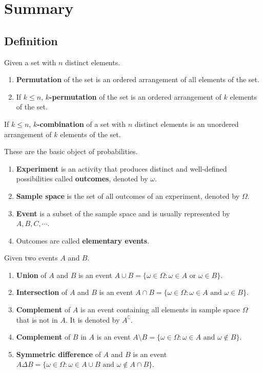 \documentclass{huhtakm-template-book}
\begin{document}
\chapter*{Summary}
\section*{Definition}
\begin{sdefn}
	Given a set with $n$ distinct elements.
	\begin{enumerate}
		\item \textbf{Permutation} of the set is an ordered arrangement of all elements of the set.
		\item If $k\leq n$, \textbf{$k$-permutation} of the set is an ordered arrangement of $k$ elements of the set.
	\end{enumerate}
\end{sdefn}
\begin{sdefn}
	If $k\leq n$, \textbf{$k$-combination} of a set with $n$ distinct elements is an unordered arrangement of $k$ elements of the set.
\end{sdefn}
\begin{sdefn}
	These are the basic object of probabilities.
	\begin{enumerate}
		\item \textbf{Experiment} is an activity that produces distinct and well-defined possibilities called \textbf{outcomes}, denoted by $\omega$.
		\item \textbf{Sample space} is the set of all outcomes of an experiment, denoted by $\Omega$.
		\item \textbf{Event} is a subset of the sample space and is usually represented by $A,B,C,\cdots$.
		\item Outcomes are called \textbf{elementary events}.
	\end{enumerate}	
\end{sdefn}
\begin{sdefn}
	Given two events $A$ and $B$.
	\begin{enumerate}
		\item \textbf{Union} of $A$ and $B$ is an event $A\cup B=\{\omega\in\Omega:\omega\in A\text{ or }\omega\in B\}$.
		\item \textbf{Intersection} of $A$ and $B$ is an event $A\cap B=\{\omega\in\Omega:\omega\in A\text{ and }\omega\in B\}$.
		\item \textbf{Complement} of $A$ is an event containing all elements in sample space $\Omega$ that is not in $A$. It is denoted by $A^{\complement}$.
		\item \textbf{Complement} of $B$ in $A$ is an event $A\setminus B=\{\omega\in\Omega:\omega\in A\text{ and }\omega\not\in B\}$.
		\item \textbf{Symmetric difference} of $A$ and $B$ is an event $A\Delta B=\{\omega\in\Omega:\omega\in A\cup B\text{ and }\omega\not\in A\cap B\}$.
	\end{enumerate}
\end{sdefn}
\end{document}
